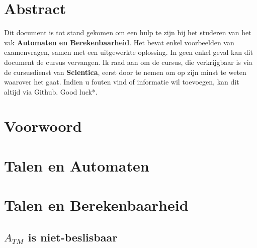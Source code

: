 \documentclass[
10pt,
a4paper,
oneside,
headinclude,footinclude, 
BCOR5mm,
]{scrartcl}
\title{\normalfont\spacedallcaps{Automata \& Computability}}
\author{\spacedlowsmallcaps{Jensen Bernard}}
\date{}
\begin{document}
\renewcommand{\sectionmark}[1]{\markright{\spacedlowsmallcaps{#1}}}
\lehead{\mbox{\llap{\small\thepage\kern1em\color{halfgray} \vline}\color{halfgray}\hspace{0.5em}\rightmark\hfil}}
\pagestyle{scrheadings}

\maketitle

\setcounter{tocdepth}{1} %

\tableofcontents

\section*{Abstract} 

Dit document is tot stand gekomen om een hulp te zijn bij het studeren van het vak \textbf{Automaten en Berekenbaarheid}. Het bevat enkel voorbeelden van examenvragen, samen met een uitgewerkte oplossing. In geen enkel geval kan dit document de cursus vervangen. Ik raad aan om de cursus, die verkrijgbaar is via de cursusdienst van \textbf{Scientica}, eerst door te nemen om op zijn minst te weten waarover het gaat. Indien u fouten vind of informatie wil toevoegen, kan dit altijd via Github. Good luck*.

{\let\thefootnote\relax{}}

\newpage 

\section{Voorwoord}

\lipsum[1-3]

\section{Talen en Automaten}

\lipsum[5] 

\section{Talen en Berekenbaarheid}

\subsection{$A_{TM}$ is niet-beslisbaar}
\end{document}
